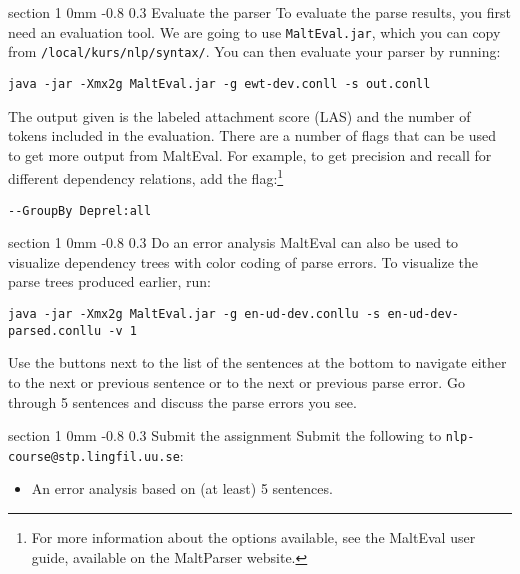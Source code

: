 \documentclass[11pt]{article}
\makeatletter
\newcommand{\newsec}[2]{\section{#1}\label{sec:#2}\noindent}
\renewcommand{\section}{\@startsection
{section}%
{1}%
{0mm}%
{-0.8\baselineskip}%
{0.3\baselineskip}%
{\bfseries\large}}%
\makeatother
\begin{document}
\newsec{Evaluate the parser}{eval}%
To evaluate the parse results, you first need an evaluation tool. We are going to use {\tt MaltEval.jar}, 
which you can copy from {\tt /local/kurs/nlp/syntax/}. You can then evaluate your parser by running:
\begin{small}
\begin{verbatim}
java -jar -Xmx2g MaltEval.jar -g ewt-dev.conll -s out.conll
\end{verbatim}
\end{small}
The output given is the labeled attachment score (LAS) and the number of tokens included in the evaluation. There are a number of flags that can be used to get more output from MaltEval. For example, to get precision and recall for different dependency relations, add the flag:\footnote{For more information about the options
available, see the MaltEval user guide, available on the MaltParser website.}
\begin{small}
\begin{verbatim}
--GroupBy Deprel:all
\end{verbatim}
\end{small}

\newsec{Do an error analysis}{err}%
MaltEval can also be used to visualize dependency trees with color coding of parse errors. To visualize the parse trees produced earlier, run:
\begin{small}
\begin{verbatim}
java -jar -Xmx2g MaltEval.jar -g en-ud-dev.conllu -s en-ud-dev-parsed.conllu -v 1
\end{verbatim}
\end{small}
Use the buttons next to the list of the sentences at the bottom to navigate either to the next or previous sentence or to the next or previous parse error. 
Go through 5 sentences and discuss the parse errors you see.

\newsec{Submit the assignment}{sub}%
Submit the following to {\tt nlp-course@stp.lingfil.uu.se}: 
\begin{itemize}[noitemsep,topsep=0.2cm]
\item An error analysis based on (at least) 5 sentences.
\end{itemize}
\end{document}
